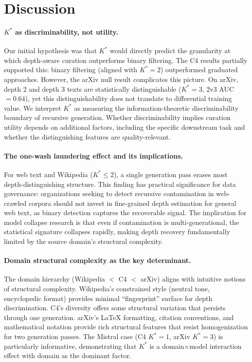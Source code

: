 \documentclass[11pt]{article}
\begin{document}
\section{Discussion}

\paragraph{$K^*$ as discriminability, not utility.}
Our initial hypothesis was that $K^*$ would directly predict the granularity at which depth-aware curation outperforms binary filtering. The C4 results partially supported this: binary filtering (aligned with $K^*{=}2$) outperformed graduated approaches. However, the arXiv null result complicates this picture. On arXiv, depth 2 and depth 3 texts are statistically distinguishable ($K^*{=}3$, 2v3 AUC $= 0.64$), yet this distinguishability does not translate to differential training value. We interpret $K^*$ as measuring the information-theoretic discriminability boundary of recursive generation. Whether discriminability implies curation utility depends on additional factors, including the specific downstream task and whether the distinguishing features are quality-relevant.

\paragraph{The one-wash laundering effect and its implications.}
For web text and Wikipedia ($K^* \le 2$), a single generation pass erases most depth-distinguishing structure. This finding has practical significance for data governance: organizations seeking to detect recursive contamination in web-crawled corpora should not invest in fine-grained depth estimation for general web text, as binary detection captures the recoverable signal. The implication for model collapse research is that even if contamination is multi-generational, the statistical signature collapses rapidly, making depth recovery fundamentally limited by the source domain's structural complexity.

\paragraph{Domain structural complexity as the key determinant.}
The domain hierarchy (Wikipedia $<$ C4 $<$ arXiv) aligns with intuitive notions of structural complexity. Wikipedia's constrained style (neutral tone, encyclopedic format) provides minimal ``fingerprint'' surface for depth discrimination. C4's diversity offers some structural variation that persists through one generation. arXiv's LaTeX formatting, citation conventions, and mathematical notation provide rich structural features that resist homogenization for two generation passes. The Mistral case (C4 $K^*{=}1$, arXiv $K^*{=}3$) is particularly informative, demonstrating that $K^*$ is a domain$\times$model interaction effect with domain as the dominant factor.
\end{document}
